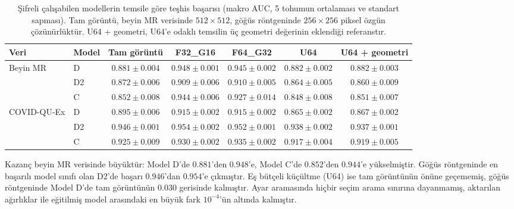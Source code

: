 \begin{table}[h!]
{\setlength{\tabcolsep}{3pt}
\caption{Şifreli çalışabilen modellerin temsile göre teşhis başarısı (makro AUC, 5 tohumun ortalaması ve standart sapması). Tam görüntü, beyin MR verisinde $512 \times 512$, göğüs röntgeninde $256 \times 256$ piksel özgün çözünürlüktür. U64 + geometri, U64'e odaklı temsilin üç geometri değerinin eklendiği referanstır.}
\begin{center}
\vspace{-6mm}
{\footnotesize
\begin{tabular}{llccccc}
\hline\hline
Veri & Model & Tam görüntü & F32\_G16 & F64\_G32 & U64 & U64 + geometri \\
\hline
Beyin MR & D & $0.881 \pm 0.004$ & $0.948 \pm 0.001$ & $0.945 \pm 0.002$ & $0.882 \pm 0.002$ & $0.882 \pm 0.003$ \\
 & D2 & $0.872 \pm 0.006$ & $0.909 \pm 0.006$ & $0.910 \pm 0.005$ & $0.864 \pm 0.005$ & $0.860 \pm 0.009$ \\
 & C & $0.852 \pm 0.008$ & $0.944 \pm 0.006$ & $0.927 \pm 0.014$ & $0.848 \pm 0.008$ & $0.851 \pm 0.007$ \\
\hline
COVID-QU-Ex & D & $0.895 \pm 0.006$ & $0.915 \pm 0.002$ & $0.915 \pm 0.002$ & $0.865 \pm 0.002$ & $0.867 \pm 0.002$ \\
 & D2 & $0.946 \pm 0.001$ & $0.954 \pm 0.002$ & $0.952 \pm 0.001$ & $0.938 \pm 0.002$ & $0.937 \pm 0.001$ \\
 & C & $0.925 \pm 0.009$ & $0.930 \pm 0.002$ & $0.935 \pm 0.002$ & $0.917 \pm 0.004$ & $0.919 \pm 0.005$ \\
\hline
\end{tabular}}
\vspace{-6mm}
\end{center}
\label{tbl:fovmodel}}
\end{table}

Kazanç beyin MR verisinde büyüktür: Model D'de $0.881$'den $0.948$'e, Model C'de $0.852$'den $0.944$'e yükselmiştir. Göğüs röntgeninde en başarılı model sınıfı olan D2'de başarı $0.946$'dan $0.954$'e çıkmıştır. Eş bütçeli küçültme (U64) ise tam görüntünün önüne geçememiş, göğüs röntgeninde Model D'de tam görüntünün $0.030$ gerisinde kalmıştır. Ayar aramasında hiçbir seçim arama sınırına dayanmamış, aktarılan ağırlıklar ile eğitilmiş model arasındaki en büyük fark $10^{-4}$'ün altında kalmıştır.

